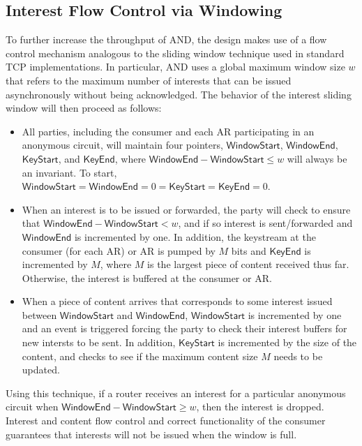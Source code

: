 \subsection{Interest Flow Control via Windowing} \label{sec:windowing}
To further increase the throughput of {\sf AND}, the design makes use of a flow control mechanism analogous to the sliding window technique used in standard TCP implementations. In particular, {\sf AND} uses a global maximum window size $w$ that refers to the maximum number of interests that can be issued asynchronously without being acknowledged. The behavior of the interest sliding window will then proceed as follows:
\begin{itemize}
  \item All parties, including the consumer and each AR participating in an anonymous circuit, will maintain four pointers, $\mathsf{WindowStart}$, $\mathsf{WindowEnd}$, $\mathsf{KeyStart}$, and $\mathsf{KeyEnd}$, where $\mathsf{WindowEnd} - \mathsf{WindowStart} \leq w$ will always be an invariant. To start, $\mathsf{WindowStart} = \mathsf{WindowEnd} = 0 = \mathsf{KeyStart} = \mathsf{KeyEnd} = 0$.
  \item When an interest is to be issued or forwarded, the party will check to ensure that $\mathsf{WindowEnd} - \mathsf{WindowStart} < w$, and if so interest is sent/forwarded and $\mathsf{WindowEnd}$ is incremented by one. In addition, the keystream at the consumer (for each AR) or AR is pumped by $M$ bits and $\mathsf{KeyEnd}$ is incremented by $M$, where $M$ is the largest piece of content received thus far. Otherwise, the interest is buffered at the consumer or AR. 
  \item When a piece of content arrives that corresponds to some interest issued between $\mathsf{WindowStart}$ and $\mathsf{WindowEnd}$, $\mathsf{WindowStart}$ is incremented by one and an event is triggered forcing the party to check their interest buffers for new intersts to be sent. In addition, $\mathsf{KeyStart}$ is incremented by the size of the content, and checks to see if the maximum content size $M$ needs to be updated.
\end{itemize}
Using this technique, if a router receives an interest for a particular anonymous circuit when $\mathsf{WindowEnd} - \mathsf{WindowStart} \geq w$, then the interest is dropped. Interest and content flow control and correct functionality of the consumer guarantees that interests will not be issued when the window is full. 

